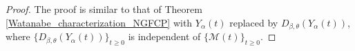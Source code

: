 \documentclass[11pt,oneside,reqno]{amsart}
\theoremstyle{definition}
\theoremstyle{remarkstyle}
\def\t{\tau}
\begin{document}
\begin{proof}
The proof is similar to that of Theorem \ref{Watanabe_characterization_NGFCP} with $Y_{\alpha}(t)$ replaced by $D_{\beta,\theta}(Y_{\alpha}(t))$, where $\{D_{\beta,\theta}(Y_{\alpha}(t))\}_{t\ge 0}$ is independent of $\{\mathcal{M}(t)\}_{t\ge 0}$.
\end{proof}
\end{document}
